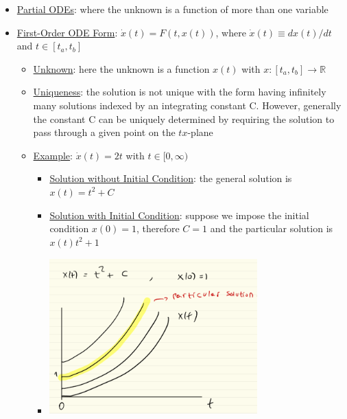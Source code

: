 \documentclass{article}
\begin{document}
\begin{itemize}
    \item \underline{Partial ODEs}: where the unknown is a function of more than one variable
    \item  \underline{First-Order ODE Form}: $\dot{x}(t) = F(t, x(t))$, where $\dot{x}(t) \equiv dx(t)/dt$ and $t \in [t_{a}, t_{b}]$
    \begin{itemize}
        \item \underline{Unknown}: here the unknown is a function $x(t)$ with $x: [t_{a}, t_{b}] \rightarrow \mathbb{R}$
        \item  \underline{Uniqueness}: the solution is not unique with the form having infinitely many solutions indexed by an integrating constant C. However, generally the constant C can be uniquely determined by requiring the solution to pass through a given point on the $tx$-plane
        \item  \underline{Example}: $\dot{x}(t) = 2t$ with $t \in [0,\infty)$
        \begin{itemize}
            \item \underline{Solution without Initial Condition}: the general solution is $x(t) = t^{2} + C$
            \item  \underline{Solution with Initial Condition}: suppose we impose the initial condition $x(0) = 1$, therefore $C=1$ and the particular solution is $x(t) t^{2} + 1$
            \item \includegraphics[width=8cm, height=6cm]{pic5}
        \end{itemize}


\end{itemize}
\end{itemize}
\end{document}
